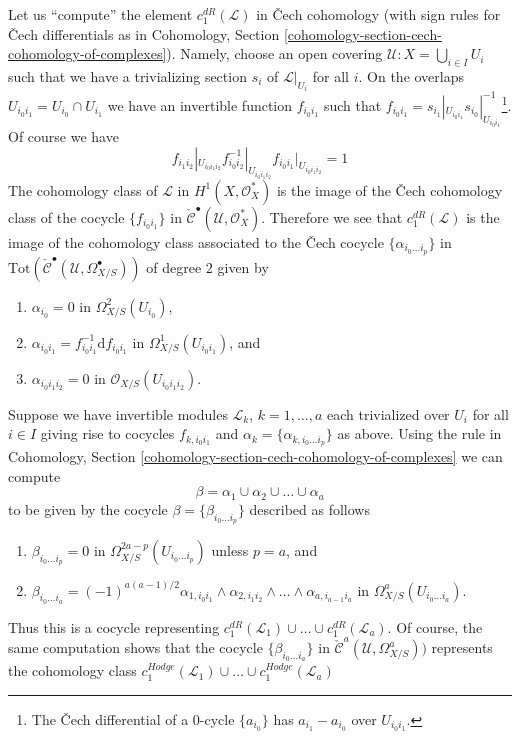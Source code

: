 \noindent
Let us ``compute'' the element $c^{dR}_1(\mathcal{L})$ in {\v C}ech
cohomology (with sign rules for {\v C}ech differentials
as in Cohomology, Section
\ref{cohomology-section-cech-cohomology-of-complexes}).
Namely, choose an open covering
$\mathcal{U} : X = \bigcup_{i \in I} U_i$ such that
we have a trivializing section $s_i$ of $\mathcal{L}|_{U_i}$ for all $i$.
On the overlaps $U_{i_0i_1} = U_{i_0} \cap U_{i_1}$
we have an invertible function $f_{i_0i_1}$ such that
$f_{i_0i_1} = s_{i_1}|_{U_{i_0i_1}} s_{i_0}|_{U_{i_0i_1}}^{-1}$\footnote{The
{\v C}ech differential of a $0$-cycle $\{a_{i_0}\}$ has
$a_{i_1} - a_{i_0}$ over $U_{i_0i_1}$.}.
Of course we have
$$
f_{i_1i_2}|_{U_{i_0i_1i_2}}
f_{i_0i_2}^{-1}|_{U_{i_0i_1i_2}}
f_{i_0i_1}|_{U_{i_0i_1i_2}} = 1
$$
The cohomology class of $\mathcal{L}$ in $H^1(X, \mathcal{O}_X^*)$ is
the image of the {\v C}ech cohomology class of the cocycle $\{f_{i_0i_1}\}$ in
$\check{\mathcal{C}}^\bullet(\mathcal{U}, \mathcal{O}_X^*)$.
Therefore we see that $c_1^{dR}(\mathcal{L})$ is the image
of the cohomology class associated to the {\v C}ech cocycle
$\{\alpha_{i_0 \ldots i_p}\}$ in
$\text{Tot}(\check{\mathcal{C}}^\bullet(\mathcal{U}, \Omega_{X/S}^\bullet))$
of degree $2$ given by
\begin{enumerate}
\item $\alpha_{i_0} = 0$ in $\Omega^2_{X/S}(U_{i_0})$,
\item $\alpha_{i_0i_1} = f_{i_0i_1}^{-1}\text{d}f_{i_0i_1}$ in
$\Omega^1_{X/S}(U_{i_0i_1})$, and
\item $\alpha_{i_0i_1i_2} = 0$ in $\mathcal{O}_{X/S}(U_{i_0i_1i_2})$.
\end{enumerate}
Suppose we have invertible modules $\mathcal{L}_k$, $k = 1, \ldots, a$
each trivialized over $U_i$ for all $i \in I$ giving rise to cocycles
$f_{k, i_0i_1}$ and $\alpha_k = \{\alpha_{k, i_0 \ldots i_p}\}$ as above.
Using the rule in
Cohomology, Section \ref{cohomology-section-cech-cohomology-of-complexes}
we can compute
$$
\beta = \alpha_1 \cup \alpha_2 \cup \ldots \cup \alpha_a
$$
to be given by the cocycle $\beta = \{\beta_{i_0 \ldots i_p}\}$
described as follows
\begin{enumerate}
\item $\beta_{i_0 \ldots i_p} = 0$ in
$\Omega^{2a - p}_{X/S}(U_{i_0 \ldots i_p})$ unless $p = a$, and
\item $\beta_{i_0 \ldots i_a} = (-1)^{a(a - 1)/2}
\alpha_{1, i_0i_1} \wedge \alpha_{2, i_1 i_2} \wedge \ldots \wedge
\alpha_{a, i_{a - 1}i_a}$ in
$\Omega^a_{X/S}(U_{i_0 \ldots i_a})$.
\end{enumerate}
Thus this is a cocycle representing
$c_1^{dR}(\mathcal{L}_1) \cup \ldots \cup c_1^{dR}(\mathcal{L}_a)$.
Of course, the same computation shows that the cocycle
$\{\beta_{i_0 \ldots i_a}\}$ in
$\check{\mathcal{C}}^a(\mathcal{U}, \Omega_{X/S}^a))$
represents the cohomology class
$c_1^{Hodge}(\mathcal{L}_1) \cup \ldots \cup c_1^{Hodge}(\mathcal{L}_a)$

